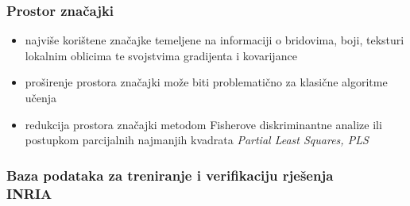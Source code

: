 \documentclass{beamer}
\begin{document}
\begin{frame}
\frametitle{Prostor značajki}
\begin{itemize}
\item najviše korištene značajke temeljene na informaciji o bridovima, boji, teksturi lokalnim oblicima te svojstvima gradijenta i kovarijance
\item proširenje prostora značajki može biti problematično za klasične algoritme učenja 
\item redukcija prostora značajki metodom Fisherove diskriminantne analize ili postupkom parcijalnih najmanjih kvadrata \emph{Partial Least Squares, PLS}
\end{itemize}
\end{frame}

\begin{frame}
\frametitle{Baza podataka za treniranje i verifikaciju rješenja \\ INRIA}


\end{frame}
\end{document}
